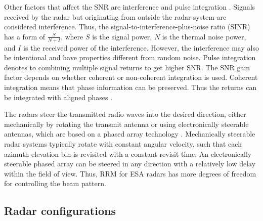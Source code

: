 \documentclass[english, 12pt, a4paper, elec, utf8, a-1b, online]{aaltothesis}
\numberwithin{equation}{section}
\begin{document}
Other factors that affect the SNR are interference and pulse integration \cite{Curry2011}.
Signals received by the radar but originating from outside the radar system are considered interference.
Thus, the signal-to-interference-plus-noise ratio (SINR) has a form of $\frac{S}{N+I}$, where
$S$ is the signal power,
$N$ is the thermal noise power, and
$I$ is the received power of the interference.
However, the interference may also be intentional and have properties different from random noise. 
Pulse integration denotes to combining multiple signal returns to get higher SNR.
The SNR gain factor depends on whether coherent or non-coherent integration is used.
Coherent integration means that phase information can be preserved. 
Thus the returns can be integrated with aligned phases \cite{Curry2011}.

The radars steer the transmitted radio waves into the desired direction, either mechanically by rotating the transmit antenna \cite{Curry2011} or using electronically steerable antennas, which are based on a phased array technology \cite{Mailloux2017}.
Mechanically steerable radar systems typically rotate with constant angular velocity, such that each azimuth-elevation bin is revisited with a constant revisit time.
An electronically steerable phased array can be steered in any direction with a relatively low delay within the field of view.
Thus, RRM for ESA radars has more degrees of freedom for controlling the beam pattern.


\subsection{Radar configurations} \label{sec:radar_types}
\end{document}
